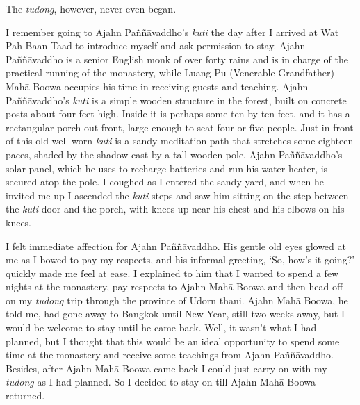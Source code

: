 The \emph{tudong}, however, never even began.

I remember going to Ajahn Paññāvaddho's \emph{kuti} the day after I
arrived at Wat Pah Baan Taad to introduce myself and ask permission to
stay. Ajahn Paññāvaddho is a senior English monk of over forty rains and
is in charge of the practical running of the monastery, while Luang Pu
(Venerable Grandfather) Mahā Boowa occupies his time in receiving guests
and teaching. Ajahn Paññāvaddho's \emph{kuti} is a simple wooden
structure in the forest, built on concrete posts about four feet high.
Inside it is perhaps some ten by ten feet, and it has a rectangular
porch out front, large enough to seat four or five people. Just in front
of this old well-worn \emph{kuti} is a sandy meditation path that
stretches some eighteen paces, shaded by the shadow cast by a tall
wooden pole. Ajahn Paññāvaddho's solar panel, which he uses to recharge
batteries and run his water heater, is secured atop the pole. I coughed
as I entered the sandy yard, and when he invited me up I ascended the
\emph{kuti} steps and saw him sitting on the step between the
\emph{kuti} door and the porch, with knees up near his chest and his
elbows on his knees.

I felt immediate affection for Ajahn Paññāvaddho. His gentle old eyes
glowed at me as I bowed to pay my respects, and his informal greeting,
`So, how's it going?' quickly made me feel at ease. I explained to him
that I wanted to spend a few nights at the monastery, pay respects to
Ajahn Mahā Boowa and then head off on my \emph{tudong} trip through the
province of Udorn thani. Ajahn Mahā Boowa, he told me, had gone away to
Bangkok until New Year, still two weeks away, but I would be welcome to
stay until he came back. Well, it wasn't what I had planned, but I
thought that this would be an ideal opportunity to spend some time at
the monastery and receive some teachings from Ajahn Paññāvaddho.
Besides, after Ajahn Mahā Boowa came back I could just carry on with my
\emph{tudong} as I had planned. So I decided to stay on till Ajahn Mahā
Boowa returned.

